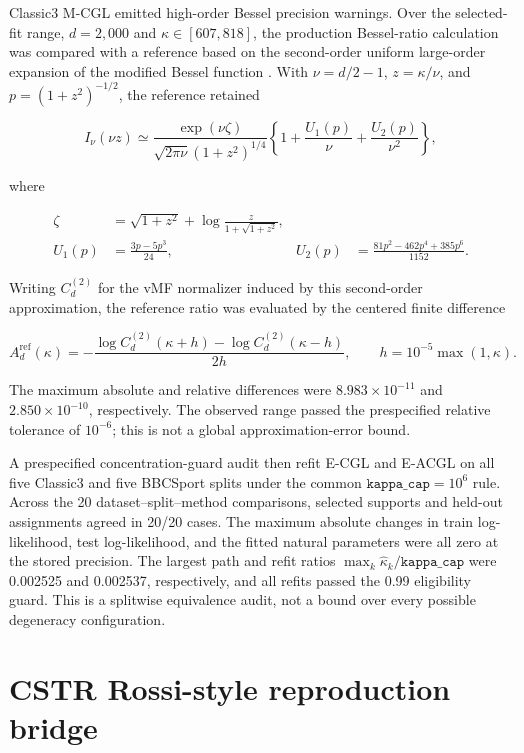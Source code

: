 \documentclass[preprint,12pt,authoryear]{elsarticle}
\begin{document}
Classic3 M-CGL emitted high-order Bessel precision warnings. Over the
selected-fit range, $d=2{,}000$ and $\kappa\in[607,818]$, the production
Bessel-ratio calculation was compared with a reference based on the
second-order uniform large-order expansion of the modified Bessel function
\citep[Sec.~10.41]{olver2010nist}. With $\nu=d/2-1$, $z=\kappa/\nu$, and
$p={(1+z^2)}^{-1/2}$, the reference retained

\[
I_\nu(\nu z)
\simeq
\frac{\exp(\nu\zeta)}{\sqrt{2\pi\nu}{(1+z^2)}^{1/4}}
\left\{1+\frac{U_1(p)}{\nu}+\frac{U_2(p)}{\nu^2}\right\},
\]

where

\[
\begin{aligned}
\zeta
&=\sqrt{1+z^2}+\log\frac{z}{1+\sqrt{1+z^2}},\\
U_1(p)
&=\frac{3p-5p^3}{24},
&
U_2(p)
&=\frac{81p^2-462p^4+385p^6}{1152}.
\end{aligned}
\]

Writing $C_d^{(2)}$ for the vMF normalizer induced by this second-order
approximation, the reference ratio was evaluated by the centered finite
difference

\[
A_d^{\mathrm{ref}}(\kappa)
=-
\frac{\log C_d^{(2)}(\kappa+h)-\log C_d^{(2)}(\kappa-h)}{2h},
\qquad
h=10^{-5}\max(1,\kappa).
\]

The maximum absolute and relative differences were
$8.983\times10^{-11}$ and $2.850\times10^{-10}$, respectively. The observed
range passed the prespecified relative tolerance of $10^{-6}$; this is not a
global approximation-error bound.

A prespecified concentration-guard audit then refit E-CGL and E-ACGL on all five
Classic3 and five BBCSport splits under the common
$\texttt{kappa\_cap}=10^6$ rule. Across the 20 dataset--split--method
comparisons, selected supports and held-out assignments agreed in 20/20
cases. The maximum absolute changes in train log-likelihood, test
log-likelihood, and the fitted natural parameters were all zero at the stored
precision. The largest path and refit ratios
$\max_k\widehat\kappa_k/\texttt{kappa\_cap}$ were 0.002525 and 0.002537,
respectively, and all refits passed the 0.99 eligibility guard. This is a
splitwise equivalence audit, not a bound over every possible degeneracy
configuration.

\section{CSTR Rossi-style reproduction bridge}
\label{sec:s-cstr-bridge}
\end{document}
